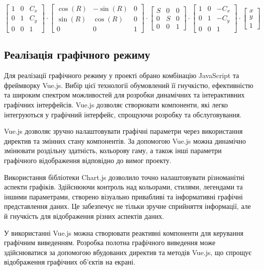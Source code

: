 \documentclass[oneside,14pt]{extarticle}
\begin{document}
\begin{normalsize}
	\[
	\begin{bmatrix} 
		1 & 0 & C_x \\
		0 & 1 & C_y \\
		0 & 0 & 1
	\end{bmatrix} 
	\cdot
	\begin{bmatrix} 
		 \cos(R) & -\sin(R) & 0 \\
		\sin(R) & \cos(R) & 0 \\
		0 & 0 & 1
	\end{bmatrix} 
	\cdot
	\begin{bmatrix} 
		S & 0 & 0 \\
		0 & S & 0 \\
		0 & 0 & 1
	\end{bmatrix}
	\cdot
	\begin{bmatrix} 
		1 & 0 & -C_x \\
		0 & 1 & -C_y \\
		0 & 0 & 1
	\end{bmatrix}
	\cdot
	\begin{bmatrix} 
		x \\
		y \\
		1
	\end{bmatrix} \]
	\subsection{Реалізація графічного режиму}
	Для реалізації графічного режиму у проекті обрано комбінацію JavaScript та фреймворку Vue.js. Вибір цієї технології обумовлений її гнучкістю, ефективністю та широким спектром можливостей для розробки динамічних та інтерактивних графічних інтерфейсів. Vue.js дозволяє створювати компоненти, які легко інтегруються у графічний інтерфейс, спрощуючи розробку та обслуговування.
	
	Vue.js дозволяє зручно налаштовувати графічні параметри через використання директив та змінних стану компонентів. За допомогою Vue.js можна динамічно змінювати роздільну здатність, кольорову гаму, а також інші параметри графічного відображення відповідно до вимог проекту.
	
	Використання бібліотеки Chart.js дозволило точно налаштовувати різноманітні аспекти графіків. Здійснюючи контроль над кольорами, стилями, легендами та іншими параметрами, створено візуально привабливі та інформативні графічні представлення даних. Це забезпечує не тільки зручне сприйняття інформації, але й гнучкість для відображення різних аспектів даних.
	
	У використанні Vue.js можна створювати реактивні компоненти для керування графічним виведенням. Розробка полотна графічного виведення може здійснюватися за допомогою вбудованих директив та методів Vue.js, що спрощує відображення графічних об'єктів на екрані.
	

\end{normalsize}
\end{document}

